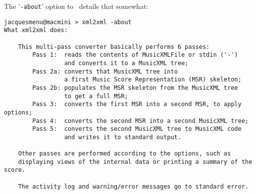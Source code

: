 The '{\tt -about}' option to \xmlToGmn\ details that somewhat:
\begin{lstlisting}[language=MusicXML]
jacquesmenu@macmini > xml2xml -about
What xml2xml does:

    This multi-pass converter basically performs 6 passes:
        Pass 1:  reads the contents of MusicXMLFile or stdin ('-')
                 and converts it to a MusicXML tree;
        Pass 2a: converts that MusicXML tree into
                 a first Music Score Representation (MSR) skeleton;
        Pass 2b: populates the MSR skeleton from the MusicXML tree
                 to get a full MSR;
        Pass 3:  converts the first MSR into a second MSR, to apply options;
        Pass 4:  converts the second MSR into a second MusicXML tree;
        Pass 5:  converts the second MusicXML tree to MusicXML code
                 and writes it to standard output.

    Other passes are performed according to the options, such as
    displaying views of the internal data or printing a summary of the score.

    The activity log and warning/error messages go to standard error.
\end{lstlisting}
